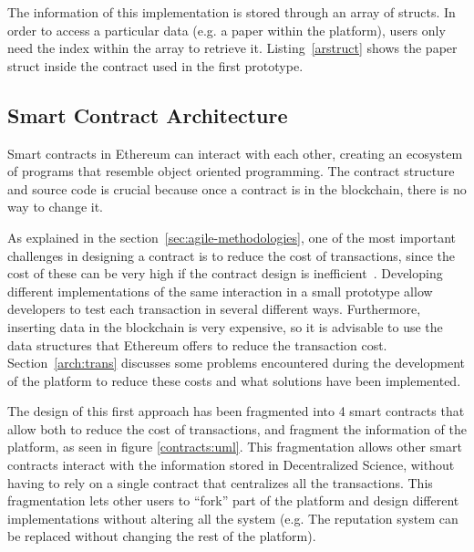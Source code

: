 The information of this implementation is stored through an array of structs. In
order to access a particular data (e.g. a paper within the platform), users only
need the index within the array to retrieve it. Listing~\ref{arstruct} shows the
paper struct inside the  contract used in the first prototype.



\subsection*{Smart Contract Architecture}
\label{arch:sca}

Smart contracts in Ethereum can interact with each other, creating an ecosystem
of programs that resemble object oriented programming. The contract structure
and source code is crucial because once a contract is in the blockchain, there
is no way to change it.

As explained in the section~\ref{sec:agile-methodologies}, one of the most
important challenges in designing a contract is to reduce the cost of
transactions, since the cost of these can be very high if the contract design is
inefficient~\cite{croman2016scaling}. Developing different implementations of
the same interaction in a small prototype allow developers to test each
transaction in several different ways. Furthermore, inserting data in the
blockchain is very expensive, so it is advisable to use the data structures that
Ethereum offers to reduce the transaction cost. Section~\ref{arch:trans}
discusses some problems encountered during the development of the platform to
reduce these costs and what solutions have been implemented.


The design of this first approach has been fragmented into 4 smart contracts
that allow both to reduce the cost of transactions, and fragment the information
of the platform, as seen in figure \ref{contracts:uml}. This fragmentation
allows other smart contracts interact with the information stored in
Decentralized Science, without having to rely on a single contract that
centralizes all the transactions. This fragmentation lets other users to
``fork'' part of the platform and design different implementations without
altering all the system (e.g. The reputation system can be replaced without
changing the rest of the platform).

